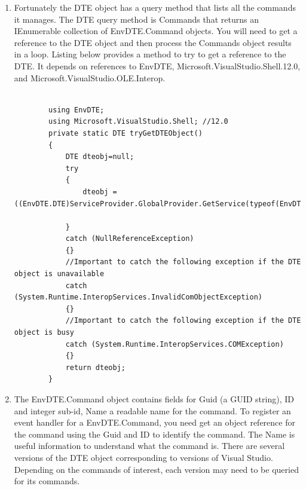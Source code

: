 \begin{enumerate}
\item

 Fortunately the DTE object has a query method that lists all the commands it manages.   The DTE query method is Commands that returns an IEnumerable collection of EnvDTE.Command objects.  You will need to get a reference to the DTE object and then process the Commands object results in a loop.  Listing below provides a method to try to get a reference to the DTE.  It depends on references to EnvDTE, Microsoft.VisualStudio.Shell.12.0, and Microsoft.VisualStudio.OLE.Interop.  

\begin{lstlisting}

		using EnvDTE;
		using Microsoft.VisualStudio.Shell; //12.0
		private static DTE tryGetDTEObject()
		{
			DTE dteobj=null;
			try
			{
				dteobj = ((EnvDTE.DTE)ServiceProvider.GlobalProvider.GetService(typeof(EnvDTE.DTE).GUID)).DTE;

			}
			catch (NullReferenceException)
			{}
			//Important to catch the following exception if the DTE object is unavailable
			catch (System.Runtime.InteropServices.InvalidComObjectException)
			{} 
			//Important to catch the following exception if the DTE object is busy
			catch (System.Runtime.InteropServices.COMException)
			{}
			return dteobj;
		}

\end{lstlisting}

\item
The EnvDTE.Command object contains fields for Guid (a GUID string), ID and integer sub-id, Name a readable name for the command.  To register an event handler for a EnvDTE.Command, you need get an object reference for the command using the Guid and ID to identify the command. The Name is useful information to understand what the command is.    There are several versions of the DTE object corresponding to versions of Visual Studio.  Depending on the commands of interest, each version may need to be queried for its commands.  

\end{enumerate}


